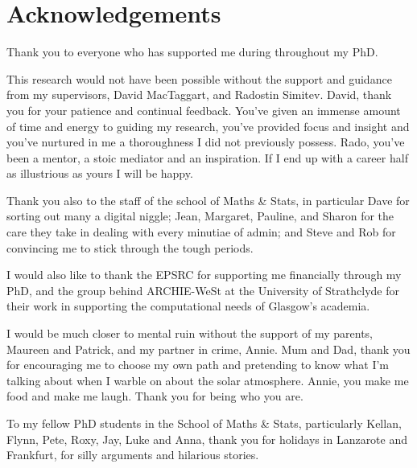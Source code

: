 \chapter{Acknowledgements}

Thank you to everyone who has supported me during throughout my PhD. 

\vspace{5mm}

This research would not have been possible without the support and guidance from my supervisors, David MacTaggart, and Radostin Simitev. David, thank you for your patience and continual feedback. You've given an immense amount of time and energy to guiding my research, you've provided focus and insight and you've nurtured in me a thoroughness I did not previously possess. Rado, you've been a mentor, a stoic mediator and an inspiration. If I end up with a career half as illustrious as yours I will be happy.

Thank you also to the staff of the school of Maths \& Stats, in particular Dave for sorting out many a digital niggle; Jean, Margaret, Pauline, and Sharon for the care they take in dealing with every minutiae of admin; and Steve and Rob for convincing me to stick through the tough periods.

I would also like to thank the EPSRC for supporting me financially through my PhD, and the group behind ARCHIE-WeSt at the University of Strathclyde for their work in supporting the computational needs of Glasgow's academia.

\vspace{5mm}

I would be much closer to mental ruin without the support of my parents, Maureen and Patrick, and my partner in crime, Annie. Mum and Dad, thank you for encouraging me to choose my own path and pretending to know what I'm talking about when I warble on about the solar atmosphere. Annie, you make me food and make me laugh. Thank you for being who you are.

\vspace{5mm}

To my fellow PhD students in the School of Maths \& Stats, particularly Kellan, Flynn, Pete, Roxy, Jay, Luke and Anna, thank you for holidays in Lanzarote and Frankfurt, for silly arguments and hilarious stories.
